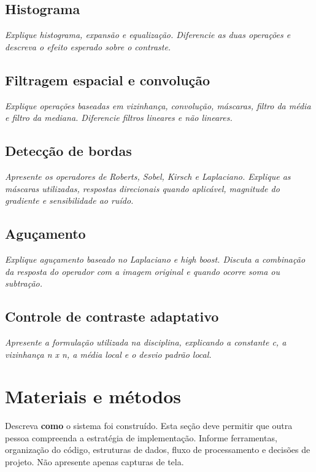 \documentclass[11pt,a4paper]{article}
\newcommand{\placeholder}[1]{\textcolor{muted}{\textit{#1}}}
\begin{document}
\subsection{Histograma}
\placeholder{Explique histograma, expansão e equalização. Diferencie as duas operações e descreva o efeito esperado sobre o contraste.}

\subsection{Filtragem espacial e convolução}
\placeholder{Explique operações baseadas em vizinhança, convolução, máscaras, filtro da média e filtro da mediana. Diferencie filtros lineares e não lineares.}

\subsection{Detecção de bordas}
\placeholder{Apresente os operadores de Roberts, Sobel, Kirsch e Laplaciano. Explique as máscaras utilizadas, respostas direcionais quando aplicável, magnitude do gradiente e sensibilidade ao ruído.}

\subsection{Aguçamento}
\placeholder{Explique aguçamento baseado no Laplaciano e high boost. Discuta a combinação da resposta do operador com a imagem original e quando ocorre soma ou subtração.}

\subsection{Controle de contraste adaptativo}
\placeholder{Apresente a formulação utilizada na disciplina, explicando a constante c, a vizinhança n x n, a média local e o desvio padrão local.}

\section{Materiais e métodos}

\begin{orientacao}
Descreva \textbf{como} o sistema foi construído. Esta seção deve permitir que outra pessoa compreenda a estratégia de implementação. Informe ferramentas, organização do código, estruturas de dados, fluxo de processamento e decisões de projeto. Não apresente apenas capturas de tela.
\end{orientacao}
\end{document}
